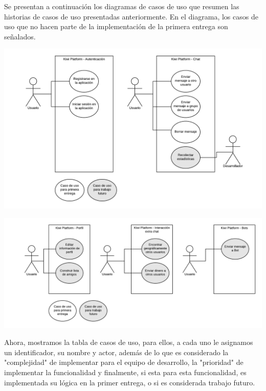 Se presentan a continuación los diagramas de casos de uso que resumen las historias de casos de uso presentadas anteriormente. En el diagrama, los casos de uso que no hacen parte de la implementación de la primera entrega son señalados.
\begin{center}
    \includegraphics[width=15cm]{Figures/P1/cases_diagram_1.png}
\end{center}
\begin{center}
    \includegraphics[width=15cm]{Figures/P1/cases_diagram_2.png}
\end{center}
Ahora, mostramos la tabla de casos de uso, para ellos, a cada uno le asignamos un identificador, su nombre y actor, además de lo que es considerado la "complejidad" de implementar para el equipo de desarrollo, la "prioridad" de implementar la funcionalidad y finalmente, si esta para esta funcionalidad, es implementada su lógica en la primer entrega, o si es considerada trabajo futuro.

